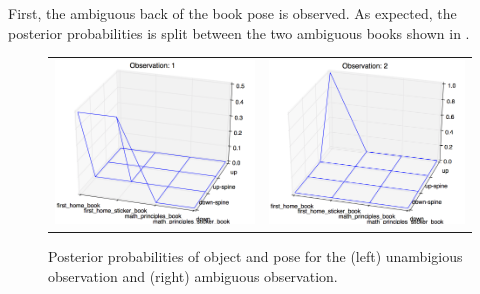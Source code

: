         First, the ambiguous back of the book pose is observed. As expected, the posterior probabilities is split between the two ambiguous books shown in .

        \begin{figure}[h]
            \centering
            \begin{tabular}{cc} 
                \includegraphics[scale=0.4]{pics/experimentObs1.png}
                    &
                \includegraphics[scale=0.4]{pics/experimentObs2.png}
            \end{tabular}
            \caption{Posterior probabilities of object and pose for the (left) unambigious observation and (right) ambiguous observation.}
            \label{fig:expObs}
        \end{figure}

